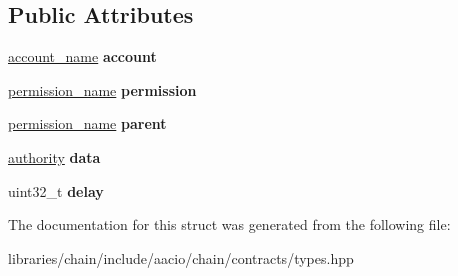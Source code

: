 \subsection*{Public Attributes}
\begin{DoxyCompactItemize}
\item 
\mbox{\label{structaacio_1_1chain_1_1contracts_1_1updateauth_a32275c9c1ad1ece436c890f055374584}} 
\mbox{\hyperlink{structaacio_1_1chain_1_1name}{account\+\_\+name}} {\bfseries account}
\item 
\mbox{\label{structaacio_1_1chain_1_1contracts_1_1updateauth_a664cf088b2fb1f47413a263cb1e728f0}} 
\mbox{\hyperlink{structaacio_1_1chain_1_1name}{permission\+\_\+name}} {\bfseries permission}
\item 
\mbox{\label{structaacio_1_1chain_1_1contracts_1_1updateauth_a01b5cd2cf663ebf60e6f65bd69edda74}} 
\mbox{\hyperlink{structaacio_1_1chain_1_1name}{permission\+\_\+name}} {\bfseries parent}
\item 
\mbox{\label{structaacio_1_1chain_1_1contracts_1_1updateauth_ac4355ff8b177e7406e2ff6628cd887db}} 
\mbox{\hyperlink{structaacio_1_1chain_1_1authority}{authority}} {\bfseries data}
\item 
\mbox{\label{structaacio_1_1chain_1_1contracts_1_1updateauth_a705e8fdcc7ba314da7850ac974a46204}} 
uint32\+\_\+t {\bfseries delay}
\end{DoxyCompactItemize}


The documentation for this struct was generated from the following file\+:\begin{DoxyCompactItemize}
\item 
libraries/chain/include/aacio/chain/contracts/types.\+hpp\end{DoxyCompactItemize}

